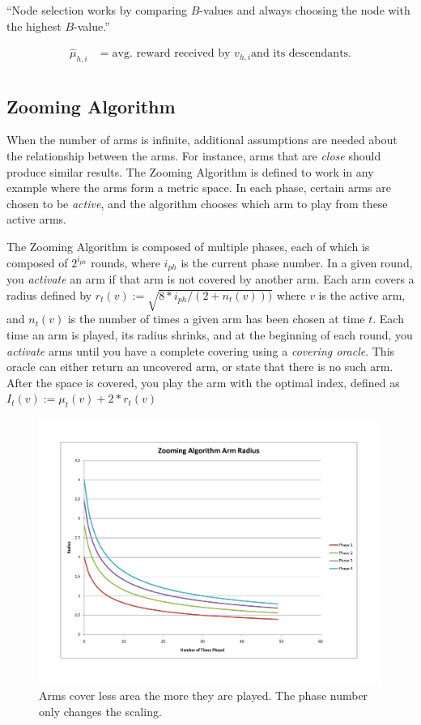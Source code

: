 ``Node selection works by comparing $B$-values and always choosing the
node with the highest $B$-value.''

\begin{align*}
  \hat{\mu}_{h,i} &= \text{avg. reward received by } v_{h,i} \text{
    and its descendants.}\\
\end{align*}



\subsection{Zooming Algorithm}
When the number of arms is infinite, additional assumptions are needed
about the relationship between the arms. For instance, arms that are
\emph{close} should produce similar results. The Zooming Algorithm is
defined to work in any example where the arms form a metric space. In
each phase, certain arms are chosen to be \emph{active}, and the
algorithm chooses which arm to play from these active arms.

The Zooming Algorithm is composed of multiple phases, each of which is
composed of $2^{i_{ph}}$ rounds, where $i_{ph}$ is the current phase
number. In a given round, you \emph{activate} an arm if that arm is
not covered by another arm. Each arm covers a radius defined by
$r_t(v):=\sqrt{8*i_{ph}/(2+n_t(v)))}$ where $v$ is the active arm, and
$n_t(v)$ is the number of times a given arm has been chosen at time
$t$. Each time an arm is played, its radius shrinks, and at the
beginning of each round, you \emph{activate} arms until you have a
complete covering using a \emph{covering oracle}. This oracle can
either return an uncovered arm, or state that there is no such
arm. After the space is covered, you play the arm with the optimal
index, defined as $I_t(v):=\mu_t(v)+2*r_t(v)$

\begin{figure}[!ht]
  \begin{center}
    \includegraphics[width=5 in]{figures/ZoomingRadius.png}
     \caption{Arms cover less area the more they are played. The phase
       number only changes the scaling.}
     \label{fig:zoomphase}
  \end{center}
\end{figure}

